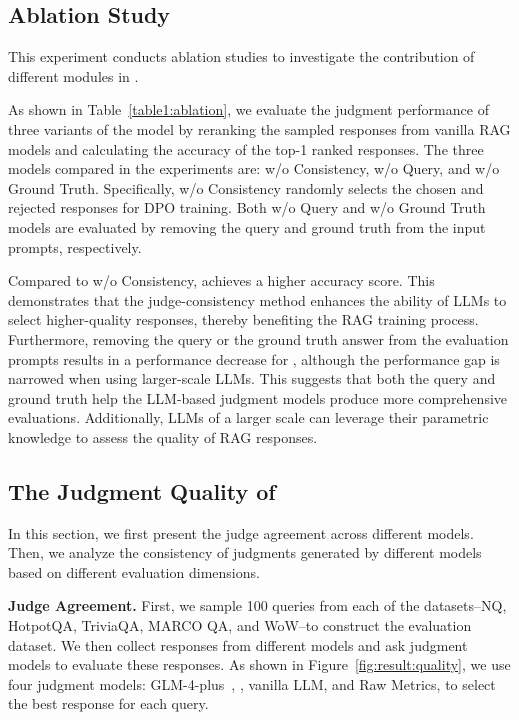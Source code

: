 \subsection{Ablation Study}
\label{sec:5.2}
This experiment conducts ablation studies to investigate the contribution of different modules in \method{}.

As shown in Table~\ref{table1:ablation}, we evaluate the judgment performance of three variants of the \method{} model by reranking the sampled responses from vanilla RAG models and calculating the accuracy of the top-1 ranked responses. The three models compared in the experiments are: \method{} w/o Consistency, \method{} w/o Query, and \method{} w/o Ground Truth. Specifically, \method{} w/o Consistency randomly selects the chosen and rejected responses for DPO training. Both \method{} w/o Query and \method{} w/o Ground Truth models are evaluated by removing the query and ground truth from the input prompts, respectively.



Compared to \method{} w/o Consistency, \method{} achieves a higher accuracy score. This demonstrates that the judge-consistency method enhances the ability of LLMs to select higher-quality responses, thereby benefiting the RAG training process. Furthermore, removing the query or the ground truth answer from the evaluation prompts results in a performance decrease for \method{}, although the performance gap is narrowed when using larger-scale LLMs. This suggests that both the query and ground truth help the LLM-based judgment models produce more comprehensive evaluations. Additionally, LLMs of a larger scale can leverage their parametric knowledge to assess the quality of RAG responses.




\subsection{The Judgment Quality of \method{}} \label{sec:5.3}
In this section, we first present the judge agreement across different models. Then, we analyze the consistency of judgments generated by different models based on different evaluation dimensions.

\textbf{Judge Agreement.} First, we sample 100 queries from each of the datasets--NQ, HotpotQA, TriviaQA, MARCO QA, and WoW--to construct the evaluation dataset. We then collect responses from different models and ask judgment models to evaluate these responses. As shown in Figure~\ref{fig:result:quality}, we use four judgment models: GLM-4-plus~\cite{du2022glm}, \method{}, vanilla LLM, and Raw Metrics, to select the best response for each query.

